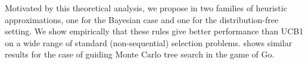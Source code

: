 Motivated by this theoretical analysis, we propose in 
two families of heuristic approximations, one for the
Bayesian case and one for the distribution-free setting.
We show empirically that these rules give better performance than UCB1 on 
a wide range of standard (non-sequential) selection problems.
 shows similar results for the case of guiding Monte Carlo tree search
in the game of Go.


